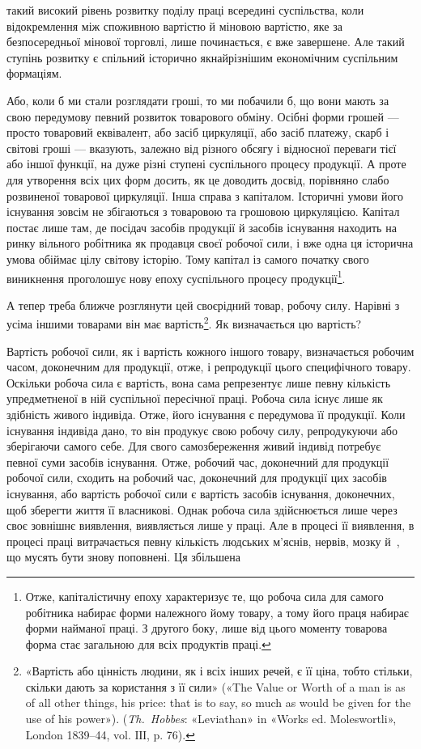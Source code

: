 \parcont{}  %
такий високий рівень розвитку поділу праці всередині суспільства,
коли відокремлення між споживною вартістю й міновою
вартістю, яке за безпосередньої мінової торговлі, лише починається,
є вже завершене. Але такий ступінь розвитку є спільний
історично якнайрізнішим економічним суспільним формаціям.

Або, коли б ми стали розглядати гроші, то ми побачили б,
що вони мають за свою передумову певний розвиток товарового
обміну. Осібні форми грошей — просто товаровий еквівалент,
або засіб циркуляції, або засіб платежу, скарб і світові гроші —
вказують, залежно від різного обсягу і відносної переваги тієї
або іншої функції, на дуже різні ступені суспільного процесу
продукції. А проте для утворення всіх цих форм досить, як це
доводить досвід, порівняно слабо розвиненої товарової циркуляції.
Інша справа з капіталом. Історичні умови його існування зовсім
не збігаються з товаровою та грошовою циркуляцією. Капітал
постає лише там, де посідач засобів продукції й засобів існування
находить на ринку вільного робітника як продавця своєї робочої
сили, і вже одна ця історична умова обіймає цілу світову історію.
Тому капітал із самого початку свого виникнення проголошує
нову епоху суспільного процесу продукції\footnote{
Отже, капіталістичну епоху характеризує те, що робоча сила для
самого робітника набирає форми належного йому товару, а тому його
праця набирає форми найманої праці. З другого боку, лише від цього моменту
товарова форма стає загальною для всіх продуктів праці.
}.

А тепер треба ближче розглянути цей своєрідний товар, робочу
силу. Нарівні з усіма іншими товарами він має вартість\footnote{
«Вартість або цінність людини, як і всіх інших речей, є її ціна,
тобто стільки, скільки дають за користання з її сили» («The Value or
Worth of a man is as of all other things, his price: that is to say, so much
as would be given for the use of his power»). (\emph{Th.~Hobbes}: «Leviathan»
in «Works ed. Moleswortli», London 1839--44, vol. IІІ, p. 76).
}. Як
визначається цю вартість?

Вартість робочої сили, як і вартість кожного іншого товару,
визначається робочим часом, доконечним для продукції, отже,
і репродукції цього специфічного товару. Оскільки робоча сила
є вартість, вона сама репрезентує лише певну кількість упредметненої
в ній суспільної пересічної праці. Робоча сила існує
лише як здібність живого індивіда. Отже, його існування є передумова
її продукції. Коли існування індивіда дано, то він продукує
свою робочу силу, репродукуючи або зберігаючи самого себе.
Для свого самозбереження живий індивід потребує певної суми
засобів існування. Отже, робочий час, доконечний для продукції
робочої сили, сходить на робочий час, доконечний для продукції
цих засобів існування, або вартість робочої сили є вартість засобів
існування, доконечних, щоб зберегти життя її власникові.
Однак робоча сила здійснюється лише через своє зовнішнє виявлення,
виявляється лише у праці. Але в процесі її виявлення,
в процесі праці витрачається певну кількість людських м’яснів,
нервів, мозку й~, що мусять бути знову поповнені. Ця збільшена
\parbreak{}  %
